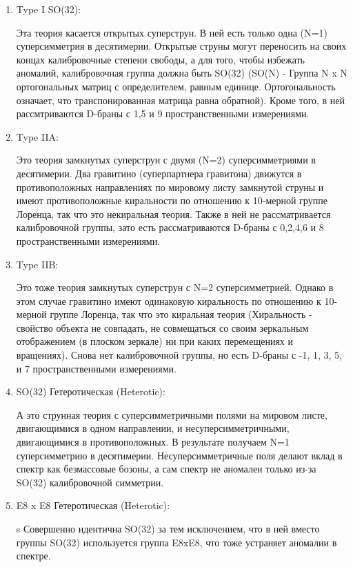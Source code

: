 \begin{enumerate}
    \item Type I SO(32):
    
    Эта теория касается открытых суперструн. В ней есть только одна (N=1) суперсимметрия в десятимерии. Открытые струны могут переносить на своих концах калибровочные степени свободы, а для того, чтобы избежать аномалий, калибровочная группа должна быть SO(32) (SO(N) - Группа N x N ортогональных матриц с определителем, равным единице. Ортогональность означает, что транспонированная матрица равна обратной). Кроме того, в ней рассмтриваются D-браны с 1,5 и 9 пространственными измерениями. 

    \item Type IIA:

    Это теория замкнутых суперструн с двумя (N=2) суперсимметриями в десятимерии. Два гравитино (суперпартнера гравитона) движутся в противоположных направлениях по мировому листу замкнутой струны и имеют противоположные киральности по отношению к 10-мерной группе Лоренца, так что это некиральная теория. Также в ней не рассматривается калибровочной группы, зато есть рассматриваются D-браны с 0,2,4,6 и 8 пространственными измерениями.

    \item Type IIB:
    
    Это тоже теория замкнутых суперструн с N=2 суперсимметрией. Однако в этом случае гравитино имеют одинаковую киральность по отношению к 10-мерной группе Лоренца, так что это киральная теория (Хиральность - свойство объекта не совпадать, не совмещаться со своим зеркальным отображением (в плоском зеркале) ни при каких перемещениях и вращениях). Снова нет калибровочной группы, но есть D-браны с -1, 1, 3, 5, и 7 пространственными измерениями. 

    \item SO(32) Гетеротическая (Heterotic):
    
    А это струнная теория с суперсимметричными полями на мировом листе, двигающимися в одном направлении, и несуперсимметричными, двигающимися в противоположных. В результате получаем N=1 суперсимметрию в десятимерии. Несуперсимметричные поля делают вклад в спектр как безмассовые бозоны, а сам спектр не аномален только из-за SO(32) калибровочной симметрии. 

    \item E8 x E8 Гетеротическая (Heterotic):
    
    s Совершенно идентична SO(32) за тем исключением, что в ней вместо группы SO(32) используется группа E8xE8, что тоже устраняет аномалии в спектре.
\end{enumerate}